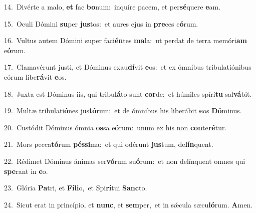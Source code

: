 {\numbfont\textcolor{\numbcolor}{14.}}~Divérte a malo, \textbf{et} fac \textbf{bo}\-num:~\star inquíre pacem, et per\-\textbf{sé}\-quere \textbf{e}\-am.\par
{\numbfont\textcolor{\numbcolor}{15.}}~Oculi Dómini \textbf{su}\-per \textbf{jus}\-tos:~\star et aures ejus in \textbf{pre}\-ces e\-\textbf{ó}\-rum.\par
{\numbfont\textcolor{\numbcolor}{16.}}~Vultus autem Dómini super faci\-\textbf{én}\-tes \textbf{ma}\-la:~\star ut perdat de terra memóri\textbf{am} e\-\textbf{ó}\-rum.\par
{\numbfont\textcolor{\numbcolor}{17.}}~Clamavérunt justi, et Dóminus exau\-\textbf{dí}\-vit \textbf{e}\-os:~\star et ex ómnibus tribulatiónibus eórum libe\-\textbf{rá}\-vit \textbf{e}\-os.\par
{\numbfont\textcolor{\numbcolor}{18.}}~Juxta est Dóminus iis, qui tribu\-\textbf{lá}\-to sunt \textbf{cor}\-de:~\star et húmiles spíri\textbf{tu} sal\-\textbf{vá}\-bit.\par
{\numbfont\textcolor{\numbcolor}{19.}}~Multæ tribulati\-\textbf{ó}\-nes jus\-\textbf{tó}\-rum:~\star et de ómnibus his liberábit \textbf{e}\-os \textbf{Dó}\-minus.\par
{\numbfont\textcolor{\numbcolor}{20.}}~Custódit Dóminus ómnia \textbf{os}\-sa e\-\textbf{ó}\-rum:~\star unum ex his non \textbf{con}\-te\-\textbf{ré}\-tur.\par
{\numbfont\textcolor{\numbcolor}{21.}}~Mors pecca\-\textbf{tó}\-rum \textbf{pés}\-\textbf{si}ma:~\star et qui odérunt \textbf{jus}\-tum, de\-\textbf{lín}\-quent.\par
{\numbfont\textcolor{\numbcolor}{22.}}~Rédimet Dóminus ánimas ser\-\textbf{vó}\-rum su\-\textbf{ó}\-rum:~\star et non delínquent omnes qui \textbf{spe}\-rant in \textbf{e}\-o.\par
{\numbfont\textcolor{\numbcolor}{23.}}~Glória \textbf{Pa}\-tri, et \textbf{Fí}\-\textbf{li}o,~\star et Spi\-\textbf{rí}\-tui \textbf{Sanc}\-to.\par
{\numbfont\textcolor{\numbcolor}{24.}}~Sicut erat in princípio, et \textbf{nunc}\-, et \textbf{sem}\-per,~\star et in sǽcula sæcu\-\textbf{ló}\-rum. \textbf{A}\-men.\par
